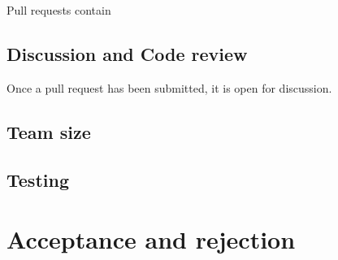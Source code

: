 \documentclass{sig-alternate}
\begin{document}
Pull requests contain 

\subsection{Discussion and Code review}

Once a pull request has been submitted, it is open for discussion. 

\subsection{Team size}

\subsection{Testing}

\section{Acceptance and rejection}
\label{sec:accrej}
\end{document}
